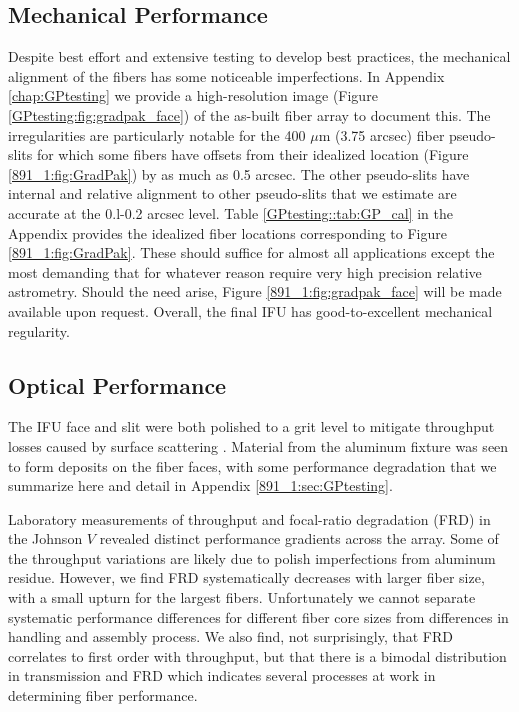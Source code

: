 \subsection{Mechanical Performance}

Despite best effort and extensive testing to develop best practices,
the mechanical alignment of the \GP fibers has some noticeable
imperfections. In Appendix \ref{chap:GPtesting} we provide a
high-resolution image (Figure \ref{GPtesting:fig:gradpak_face}) of the
as-built fiber array to document this. The irregularities are
particularly notable for the 400 $\mu$m (3.75 arcsec) fiber
pseudo-slits for which some fibers have offsets from their idealized
location (Figure \ref{891_1:fig:GradPak}) by as much as 0.5
arcsec. The other pseudo-slits have internal and relative alignment to
other pseudo-slits that we estimate are accurate at the 0.l-0.2 arcsec
level. Table \ref{GPtesting::tab:GP_cal} in the Appendix provides the
idealized fiber locations corresponding to Figure
\ref{891_1:fig:GradPak}. These should suffice for almost all
applications except the most demanding that for whatever reason
require very high precision relative astrometry. Should the need
arise, Figure \ref{891_1:fig:gradpak_face} will be made available upon
request. Overall, the final IFU has good-to-excellent mechanical
regularity.

\subsection{Optical Performance}

\label{891_1:sec:gradpak_performance}

The IFU face and slit were both polished to a  grit
level to mitigate throughput losses caused by surface scattering
\citep{Eigenbrot12}. Material from the aluminum fixture was seen to
form deposits on the fiber faces, with some performance degradation
that we summarize here and detail in Appendix \ref{891_1:sec:GPtesting}.

Laboratory measurements of throughput and focal-ratio degradation
(FRD) in the Johnson $V$ revealed distinct performance gradients
across the array. Some of the throughput variations are likely due to
polish imperfections from aluminum residue. However, we find FRD
systematically decreases with larger fiber size, with a small upturn
for the largest fibers. Unfortunately we cannot separate systematic
performance differences for different fiber core sizes from
differences in handling and assembly process. We also find, not
surprisingly, that FRD correlates to first order with throughput, but
that there is a bimodal distribution in transmission and FRD which
indicates several processes at work in determining fiber performance.

